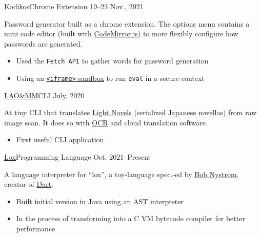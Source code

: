 \documentclass[10pt,a4paper,ragged2e,withhyper]{altacv}
\begin{document}
\begin{paracol}{2}
		\cvevent
		{\href{https://github.com/jaacko-torus/kodikos/}{\uline{Kodikos}}{\hr}Chrome Extension}
		{{\CVTagHTMLCSS}{\CVTagJavaScript}}
		{19--23 Nov., 2021}{}
		\vspace{-0.3cm}
		\begin{justify}
			Password generator built as a chrome extension. The options menu contains a mini code editor (built with \href{https://codemirror.net/}{\uline{CodeMirror.js}}) to more flexibly configure how passwords are generated.
		\end{justify}
		\vspace{-0.2cm}
		\smallskip
		\begin{itemize}
			\item Used the \texttt{Fetch API} to gather words for password generation
			\item Using an \href{https://developer.mozilla.org/en-US/docs/Web/HTTP/Headers/Content-Security-Policy/sandbox/}{\uline{\texttt{<iframe>} sandbox}} to run \texttt{eval} in a secure context
		\end{itemize}
		
		\divider
		
		\cvevent
		{\href{https://github.com/jaacko-torus/lao-mm/}{\uline{LAO\&MM}}{\hr}CLI}
		{{\CVTagRuby}{\CVTagOCRA}}
		{July, 2020}{}
		\vspace{-0.3cm}
		\begin{justify}
			At tiny CLI that translates \href{https://en.wikipedia.org/wiki/Light_novel}{\uline{Light Novels}} (serialized Japanese novellas) from raw image scan. It does so with \href{http://capture2text.sourceforge.net/}{\uline{OCR}} and cloud translation software.
		\end{justify}
		\vspace{-0.2cm}
		\smallskip
		\begin{itemize}
			\item First useful CLI application
		\end{itemize}
		
		\divider
		
		\cvevent
		{\href{https://github.com/jaacko-torus/lox}{\uline{Lox}}{\hr}Programming Language}
		{{\CVTagJava}{\CVTagC}}
		{Oct. 2021--Present}{}
		\vspace{-0.3cm}
		\begin{justify}
			A language interpreter for ``lox'', a toy-language spec.-ed by \href{https://github.com/munificent}{\uline{Bob Nystrom}}, creator of \href{https://en.wikipedia.org/wiki/Dart_(programming_language)}{\uline{Dart}}.
		\end{justify}
		\vspace{-0.2cm}
		\smallskip
		\begin{itemize}
			\item Built initial version in Java using an AST interpreter
			\item In the process of transforming into a C VM bytecode compiler for better performance
		\end{itemize}
		

\end{paracol}
\end{document}
